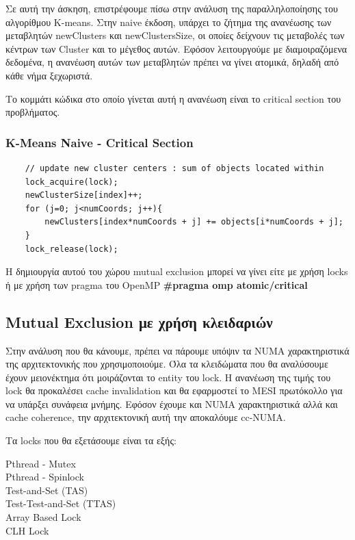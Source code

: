 \documentclass[../final_report.tex]{subfiles}
\begin{document}
Σε αυτή την άσκηση, επιστρέφουμε πίσω στην ανάλυση της παραλληλοποίησης του αλγορίθμου K-means. Στην naive 
έκδοση, υπάρχει το ζήτημα της ανανέωσης των μεταβλητών newClusters και newClustersSize, οι οποίες δείχνουν
τις μεταβολές των κέντρων των Cluster και το μέγεθος αυτών. Εφόσον λειτουργούμε με διαμοιραζόμενα δεδομένα,
η ανανέωση αυτών των μεταβλητών πρέπει να γίνει ατομικά, δηλαδή από κάθε νήμα ξεχωριστά.

Το κομμάτι κώδικα στο οποίο γίνεται αυτή η ανανέωση είναι το critical section του προβλήματος.

\subsubsection*{K-Means Naive - Critical Section}
\begin{lstlisting}
    // update new cluster centers : sum of objects located within 
    lock_acquire(lock);
    newClusterSize[index]++;
    for (j=0; j<numCoords; j++){
        newClusters[index*numCoords + j] += objects[i*numCoords + j];
    }
    lock_release(lock);
\end{lstlisting}

Η δημιουργία αυτού του χώρου mutual exclusion μπορεί να γίνει είτε με χρήση locks ή με χρήση
των pragma του OpenMP \textbf{\#pragma omp atomic/critical}

\subsection{Mutual Exclusion με χρήση κλειδαριών}

Στην ανάλυση που θα κάνουμε, πρέπει να πάρουμε υπόψιν τα NUMA χαρακτηριστικά της 
αρχιτεκτονικής που χρησιμοποιούμε. Όλα τα κλειδώματα που θα αναλύσουμε έχουν μειονέκτημα
ότι μοιράζονται το entity του lock. Η ανανέωση της τιμής του lock θα προκαλέσει cache invalidation
και θα εφαρμοστεί το MESI πρωτόκολλο για να υπάρξει συνάφεια μνήμης. Εφόσον έχουμε και NUMA χαρακτηριστικά
αλλά και cache coherence, την αρχιτεκτονική αυτή την αποκαλόυμε cc-NUMA.


Τα locks που θα εξετάσουμε είναι τα εξής:

\begin{description}
    \item [Pthread - Mutex]
    \item [Pthread - Spinlock]
    \item [Test-and-Set (TAS)]
    \item [Test-Test-and-Set (TTAS)]
    \item [Array Based Lock] 
    \item [CLH Lock] 
\end{description}
\end{document}

